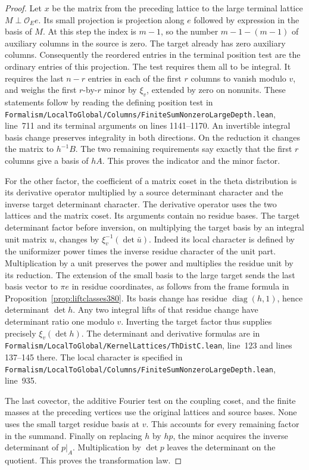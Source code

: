 \documentclass[a4paper,11pt]{article}
\theoremstyle{definition}
\theoremstyle{remark}
\newcommand{\srcloc}[2]{{\small\nolinkurl{#1.lean}}, line~#2}
\numberwithin{equation}{section}
\begin{document}
\begin{proof}
Let \(x\) be the matrix from the preceding lattice to the large
terminal lattice \(M\perp\mathcal O_E e\). Its small projection
is projection along \(e\) followed by expression in the basis
of \(M\). At this step the index is \(m-1\), so the number
\(m-1-(m-1)\) of auxiliary columns in the source is zero.
The target already has zero auxiliary columns. Consequently
the reordered entries in the terminal position test are the
ordinary entries of this projection. The test requires them all
to be integral. It requires the last \(n-r\) entries in each
of the first \(r\) columns to vanish modulo \(v\), and weighs
the first \(r\)-by-\(r\) minor by \(\xi_v\), extended by zero
on nonunits. These statements follow by reading the defining
position test in
\srcloc{Formalism/LocalToGlobal/Columns/FiniteSumNonzeroLargeDepth}{711}
and its terminal arguments on lines 1141--1170. An invertible
integral basis change preserves integrality in both directions.
On the reduction it changes the matrix to \(h^{-1}B\).
The two remaining requirements say exactly that the first
\(r\) columns give a basis of \(hA\). This proves the indicator
and the minor factor.

For the other factor, the coefficient of a matrix coset in the
theta distribution is its derivative operator multiplied by a
source determinant character and the inverse target determinant
character. The derivative operator uses the two lattices and
the matrix coset. Its arguments contain no residue bases.
The target determinant factor before inversion, on multiplying
the target basis by an integral unit matrix \(u\), changes by
\(\xi_v^{-1}(\det\bar u)\). Indeed its local character is
defined by the uniformizer power times the inverse residue
character of the unit part. Multiplication by a unit preserves
the power and multiplies the residue unit by its reduction.
The extension of the small basis to the large target sends
the last basis vector to \(\pi e\) in residue coordinates,
as follows from the frame formula in
Proposition~\ref{prop:liftclasses380}. Its basis change has
residue \(\operatorname{diag}(h,1)\), hence determinant
\(\det h\). Any two integral lifts of that residue change
have determinant ratio one modulo \(v\). Inverting the target
factor thus supplies precisely \(\xi_v(\det h)\).
The determinant and derivative formulas are in
\srcloc{Formalism/LocalToGlobal/KernelLattices/ThDistC}{123}
and lines 137--145 there. The local character is specified in
\srcloc{Formalism/LocalToGlobal/Columns/FiniteSumNonzeroLargeDepth}{935}.

The last covector, the additive Fourier test on the coupling
coset, and the finite masses at the preceding vertices use
the original lattices and source bases. None uses the
small target residue basis at \(v\). This accounts for every
remaining factor in the summand. Finally on replacing \(h\)
by \(hp\), the minor acquires the inverse determinant of
\(p|_A\). Multiplication by \(\det p\) leaves the determinant
on the quotient. This proves the transformation law.
\end{proof}
\end{document}
